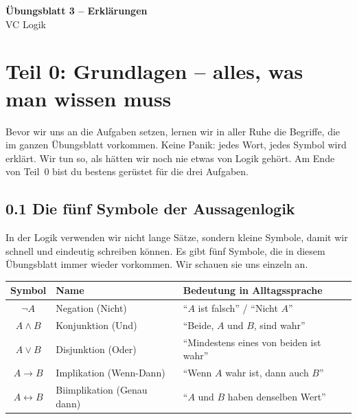 \documentclass[a4paper,12pt]{article}
\begin{document}
\begin{center}
{\LARGE\bfseries \"Ubungsblatt 3 -- Erkl\"arungen}\\[0.5em]
{\large VC Logik}
\end{center}

\bigskip


\section*{Teil 0: Grundlagen -- alles, was man wissen muss}

Bevor wir uns an die Aufgaben setzen, lernen wir in aller Ruhe die
Begriffe, die im ganzen \"Ubungsblatt vorkommen. Keine Panik: jedes
Wort, jedes Symbol wird erkl\"art. Wir tun so, als h\"atten wir noch
nie etwas von Logik geh\"ort. Am Ende von Teil~0 bist du bestens
ger\"ustet f\"ur die drei Aufgaben.

\subsection*{0.1 Die f\"unf Symbole der Aussagenlogik}

In der Logik verwenden wir nicht lange S\"atze, sondern kleine Symbole,
damit wir schnell und eindeutig schreiben k\"onnen. Es gibt f\"unf
Symbole, die in diesem \"Ubungsblatt immer wieder vorkommen. Wir
schauen sie uns einzeln an.

\begin{center}
\renewcommand{\arraystretch}{1.5}
\begin{tabular}{c|l|l}
\toprule
\textbf{Symbol} & \textbf{Name} & \textbf{Bedeutung in Alltagssprache} \\
\midrule
$\neg A$ & Negation (Nicht) & "`$A$ ist falsch"' / "`Nicht $A$"' \\
$A \wedge B$ & Konjunktion (Und) & "`Beide, $A$ und $B$, sind wahr"' \\
$A \vee B$ & Disjunktion (Oder) & "`Mindestens eines von beiden ist wahr"' \\
$A \to B$ & Implikation (Wenn-Dann) & "`Wenn $A$ wahr ist, dann auch $B$"' \\
$A \leftrightarrow B$ & Biimplikation (Genau dann) & "`$A$ und $B$ haben denselben Wert"' \\
\bottomrule
\end{tabular}
\end{center}
\end{document}
